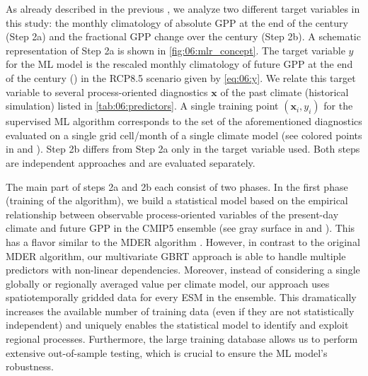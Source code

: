 As already described in the previous , we analyze
two different target variables in this study: the monthly climatology of
absolute \ac{GPP} at the end of the  century (Step 2a) and the
fractional \ac{GPP} change over the  century (Step 2b). A schematic
representation of Step 2a is shown in \cref{fig:06:mlr_concept}. The target
variable $y$ for the \ac{ML} model is the rescaled monthly climatology of
future GPP at the end of the  century () in the
\acs{RCP}8.5 scenario given by \cref{eq:06:y}. We relate this target variable
to several process-oriented diagnostics $\bm{x}$ of the past climate
(historical simulation) listed in \cref{tab:06:predictors}. A single training
point $\left( \bm{x}_i, y_i \right)$ for the supervised \ac{ML} algorithm
corresponds to the set of the aforementioned diagnostics evaluated on a single
grid cell/month of a single climate model (see colored points in
  and ). Step 2b differs
from Step 2a only in the target variable used. Both steps are independent
approaches and are evaluated separately.

The main part of steps 2a and 2b each consist of two phases. In the first phase
(training of the algorithm), we build a statistical model based on the
empirical relationship between observable process-oriented variables of the
present-day climate and future \ac{GPP} in the \acs{CMIP}5 ensemble (see gray
surface in 
 and
). This has a flavor similar
to the \ac{MDER} algorithm . However, in contrast to the original
\ac{MDER} algorithm, our multivariate \ac{GBRT} approach is able to handle
multiple predictors with non-linear dependencies. Moreover, instead of
considering a single globally or regionally averaged value per climate model,
our approach uses spatiotemporally gridded data for every \ac{ESM} in the
ensemble. This dramatically increases the available number of training data
(even if they are not statistically independent) and uniquely enables the
statistical model to identify and exploit regional processes. Furthermore, the
large training database allows us to perform extensive out-of-sample testing,
which is crucial to ensure the \ac{ML} model's robustness.

